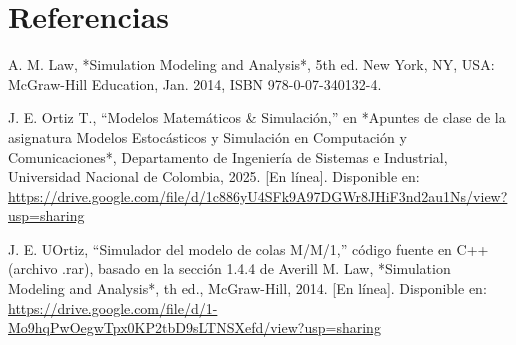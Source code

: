 \documentclass{article}
\begin{document}
\section{Referencias}
\renewcommand{\refname}{}
\begin{thebibliography}{9}

 \label{ref:modSim} A. M. Law, *Simulation Modeling and Analysis*, 5th ed.
New York, NY, USA: McGraw-Hill Education, Jan. 2014, ISBN 978-0-07-340132-4.

 \label{ref:matSim} J. E. Ortiz T., “Modelos Matemáticos \& Simulación,”
 en *Apuntes de clase de la asignatura Modelos Estocásticos y Simulación en
 Computación y Comunicaciones*, Departamento de Ingeniería de Sistemas e Industrial,
 Universidad Nacional de Colombia, 2025. [En línea]. Disponible en:
 \url{https://drive.google.com/file/d/1c886yU4SFk9A97DGWr8JHiF3nd2au1Ns/view?usp=sharing}

  \label{ref:cimColas} J. E. UOrtiz, “Simulador del modelo de colas M/M/1,”
 código fuente en C++ (archivo .rar), basado en la sección
 1.4.4 de Averill M. Law, *Simulation Modeling and Analysis*,
 th ed., McGraw-Hill, 2014. [En línea]. Disponible en:
 \url{https://drive.google.com/file/d/1-Mo9hqPwOegwTpx0KP2tbD9sLTNSXefd/view?usp=sharing}



\end{thebibliography}
\end{document}
